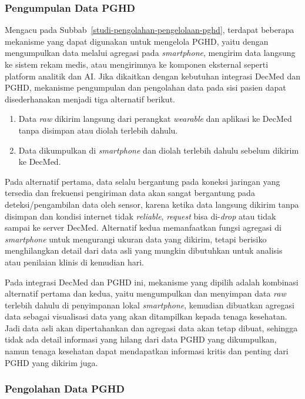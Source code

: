\subsubsection{Pengumpulan Data PGHD}\label{alternatif-pengumpulan-pghd}

Mengacu pada Subbab~\ref{studi-pengolahan-pengelolaan-pghd}, terdapat beberapa mekanisme yang dapat digunakan untuk mengelola PGHD, yaitu dengan mengumpulkan data melalui agregasi pada \textit{smartphone}, mengirim data langsung ke sistem rekam medis, atau mengirimnya ke komponen eksternal seperti platform analitik dan AI\@. 
Jika dikaitkan dengan kebutuhan integrasi DecMed dan PGHD, mekanisme pengumpulan dan pengolahan data pada sisi pasien dapat disederhanakan menjadi tiga alternatif berikut.

\begin{enumerate}
  \item Data \textit{raw} dikirim langsung dari perangkat \textit{wearable} dan aplikasi ke DecMed tanpa disimpan atau diolah terlebih dahulu.
  \item Data dikumpulkan di \textit{smartphone} dan diolah terlebih dahulu sebelum dikirim ke DecMed.
\end{enumerate}

Pada alternatif pertama, data selalu bergantung pada koneksi jaringan yang tersedia dan frekuensi pengiriman data akan sangat bergantung pada deteksi/pengambilan data oleh sensor, karena ketika data langsung dikirim tanpa disimpan dan kondisi internet tidak \textit{reliable}, \textit{request} bisa di-\textit{drop} atau tidak sampai ke server DecMed. 
Alternatif kedua memanfaatkan fungsi agregasi di \textit{smartphone} untuk mengurangi ukuran data yang dikirim, tetapi berisiko menghilangkan detail dari data asli yang mungkin dibutuhkan untuk analisis atau penilaian klinis di kemudian hari. 

Pada integrasi DecMed dan PGHD ini, mekanisme yang dipilih adalah kombinasi alternatif pertama dan kedua, yaitu mengumpulkan dan menyimpan data \textit{raw} terlebih dahulu di penyimpanan lokal \textit{smartphone}, kemudian dibuatkan agregasi data sebagai visualisasi data yang akan ditampilkan kepada tenaga kesehatan.
Jadi data asli akan dipertahankan dan agregasi data akan tetap dibuat, sehingga tidak ada detail informasi yang hilang dari data PGHD yang dikumpulkan, namun tenaga kesehatan dapat mendapatkan informasi kritis dan penting dari PGHD yang dikirim juga.

\subsubsection{Pengolahan Data PGHD}\label{alternatif-pengolahan-pghd}


